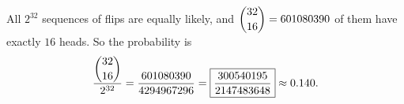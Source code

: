 All $2^{32}$ sequences of flips are equally likely, and $\dbinom{32}{16}=601080390$ of them have exactly $16$ heads. So the probability is
\[\dfrac{\dbinom{32}{16}}{2^{32}}=\dfrac{601080390}{4294967296}=\boxed{\dfrac{300540195}{2147483648}}\approx0.140.\]
